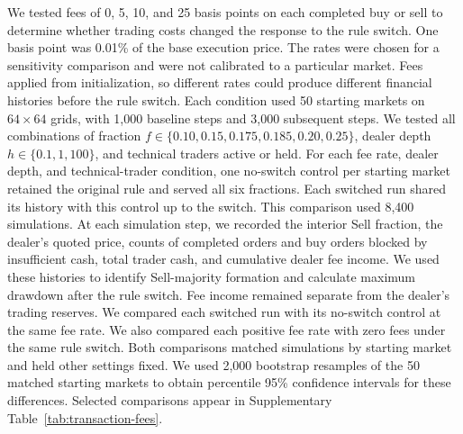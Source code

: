 We tested fees of 0, 5, 10, and 25 basis points on each completed buy or
sell to determine whether trading costs changed the response to the rule
switch. One basis point was 0.01\% of the base execution price. The rates
were chosen for a sensitivity comparison and were not calibrated to a
particular market. Fees applied from initialization, so different rates
could produce different financial histories before the rule switch.
Each condition used 50 starting markets on $64\times64$ grids, with
1,000 baseline steps and 3,000 subsequent steps. We tested all combinations
of fraction $f\in\{0.10,0.15,0.175,0.185,0.20,0.25\}$,
dealer depth $h\in\{0.1,1,100\}$, and technical traders active or held. For each fee
rate, dealer depth, and technical-trader condition, one no-switch control per
starting market retained the original rule and served all six
fractions. Each switched run shared its history with this
control up to the switch. This comparison used 8,400 simulations.
At each simulation step, we recorded the interior Sell fraction, the
dealer's quoted price, counts of completed orders and buy orders blocked
by insufficient cash, total trader cash, and cumulative dealer fee income.
We used these histories to identify Sell-majority formation and calculate
maximum drawdown after the rule switch. Fee income remained separate from
the dealer's trading reserves. We compared each switched run
with its no-switch control at the same fee rate. We also compared each positive fee
rate with zero fees under the same rule switch. Both comparisons matched
simulations by starting market and held other settings fixed. We used
2,000 bootstrap resamples of the 50 matched starting markets to obtain
percentile 95\% confidence intervals for these differences. Selected
comparisons appear in Supplementary Table~\ref{tab:transaction-fees}.
